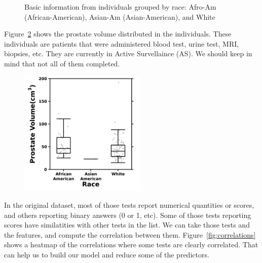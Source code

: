 \documentclass[]{article}
\begin{document}
\begin{figure}[H]
\begin{tabular}{|c|c|}
      \hline
\end{tabular}
\caption{Basic information from individuals grouped by race: Afro-Am (African-American), Asian-Am
(Asian-American), and White}
\label{fig:basic}
\end{figure}

\noindent Figure~\ref{fig:basic2} shows the prostate volume distributed in the individuals. These individuals 
are patients that were administered blood test, urine test, MRI, biopsies, etc. They are currently in 
Active Survellaince (AS). We should keep in mind that not all of them completed.  \\

\begin{figure}
\centering
    \includegraphics[width=60mm]{png/prostate_volume.png} \\
\caption{}
\label{fig:basic2}
\end{figure}

\noindent In the original dataset, most of those tests report numerical quantities or scores, and others  
reporting binary answers (0 or 1, etc). Some of those tests reporting scores have similatities with 
other tests in the list. We can take those tests and the features, and compute the correlation between them. 
Figure~\ref{fig:correlations} shows a heatmap of the correlations  where some tests are clearly correlated. 
That can help us to build our model and reduce some of the predictors. \\
\end{document}
